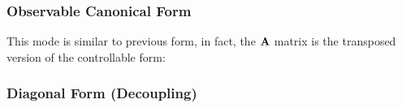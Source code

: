 \subsubsection{Observable Canonical Form}

This mode is similar to previous form, in fact, the \(\bm{\mathrm{A}}\) matrix is the transposed version of the controllable form:

\par\vspace{.5em}\noindent{}

\subsubsection{Diagonal Form (Decoupling)}

